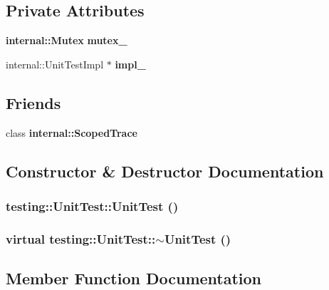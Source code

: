 \subsection*{Private Attributes}
\begin{CompactItemize}
\item 
{\bf internal::Mutex} {\bf mutex\_\-}
\item 
internal::UnitTestImpl $\ast$ {\bf impl\_\-}
\end{CompactItemize}
\subsection*{Friends}
\begin{CompactItemize}
\item 
class {\bf internal::ScopedTrace}
\end{CompactItemize}


\subsection{Constructor \& Destructor Documentation}
\subsubsection{\setlength{\rightskip}{0pt plus 5cm}testing::UnitTest::UnitTest ()\hspace{0.3cm}{\tt  [private]}}\label{classtesting_1_1UnitTest_ad2f55aa951b8975930d7f4022feff08}


\subsubsection{\setlength{\rightskip}{0pt plus 5cm}virtual testing::UnitTest::$\sim$UnitTest ()\hspace{0.3cm}{\tt  [private, virtual]}}\label{classtesting_1_1UnitTest_c320ce8c6d7eb6d02240c181ef30bb07}




\subsection{Member Function Documentation}
